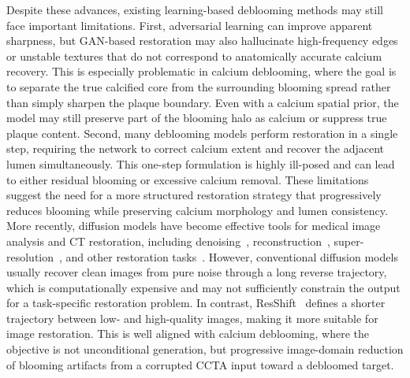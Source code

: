 \documentclass[singleLetter,times]{sagej}
\begin{document}
Despite these advances, existing learning-based deblooming methods may still face important limitations. First, adversarial learning can improve apparent sharpness, but GAN-based restoration may also hallucinate high-frequency edges or unstable textures that do not correspond to anatomically accurate calcium recovery. This is especially problematic in calcium deblooming, where the goal is to separate the true calcified core from the surrounding blooming spread rather than simply sharpen the plaque boundary. Even with a calcium spatial prior, the model may still preserve part of the blooming halo as calcium or suppress true plaque content. Second, many deblooming models perform restoration in a single step, requiring the network to correct calcium extent and recover the adjacent lumen simultaneously. This one-step formulation is highly ill-posed and can lead to either residual blooming or excessive calcium removal. These limitations suggest the need for a more structured restoration strategy that progressively reduces blooming while preserving calcium morphology and lumen consistency.
More recently, diffusion models have become effective tools for medical image analysis and CT restoration, including denoising~\cite{xia2022lowdosectusingdenoising,liuZeroShotdenoising}, reconstruction~\cite{Peng2024}, super-resolution~\cite{niu20243dphotoncountingct,wiedeman2024photoncountingctusingconditional}, and other restoration tasks~\cite{Graf2023,hidiff,LatentPaint,liu2025erasediffusionempoweringobject,ShiPrivacy,wang2025pathologyinformedlatentdiffusionmodel,WODZINSKI2024109129}. However, conventional diffusion models usually recover clean images from pure noise through a long reverse trajectory, which is computationally expensive and may not sufficiently constrain the output for a task-specific restoration problem. In contrast, ResShift~\cite{resshift} defines a shorter trajectory between low- and high-quality images, making it more suitable for image restoration. This is well aligned with calcium deblooming, where the objective is not unconditional generation, but progressive image-domain reduction of blooming artifacts from a corrupted CCTA input toward a debloomed target.
\end{document}
